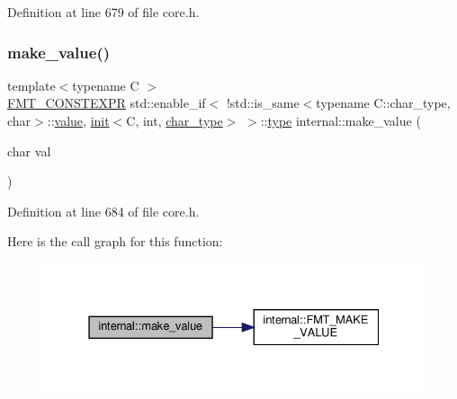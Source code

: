 Definition at line 679 of file core.\+h.

\mbox{\label{namespaceinternal_ad8fe07e2220b7ad5d8d264cdf5a533ad}} 
\subsubsection{\texorpdfstring{make\+\_\+value()}{make\_value()}\hspace{0.1cm}{\footnotesize\ttfamily [2/8]}}
{\footnotesize\ttfamily template$<$typename C $>$ \\
\hyperlink{core_8h_a69201cb276383873487bf68b4ef8b4cd}{F\+M\+T\+\_\+\+C\+O\+N\+S\+T\+E\+X\+PR} std\+::enable\+\_\+if$<$ !std\+::is\+\_\+same$<$typename C\+::char\+\_\+type, char$>$\+::\hyperlink{classinternal_1_1value}{value}, \hyperlink{structinternal_1_1init}{init}$<$C, int, \hyperlink{namespaceinternal_a8661864098ac0acff9a6dd7e66f59038a57b8984c55996e4117342a9cd2dc313e}{char\+\_\+type}$>$ $>$\+::\hyperlink{namespaceinternal_a8661864098ac0acff9a6dd7e66f59038}{type} internal\+::make\+\_\+value (\begin{DoxyParamCaption}\item[{char}]{val }\end{DoxyParamCaption})}



Definition at line 684 of file core.\+h.

Here is the call graph for this function\+:
\nopagebreak
\begin{figure}[H]
\begin{center}
\leavevmode
\includegraphics[width=331pt]{namespaceinternal_ad8fe07e2220b7ad5d8d264cdf5a533ad_cgraph}
\end{center}
\end{figure}
\mbox{\label{namespaceinternal_aa551b02f947d056cac41aa5a530a0176}} 
